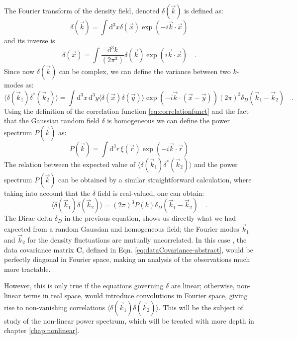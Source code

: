 The Fourier transform of the density field, denoted $\delta(\vec k)$ is defined as:
\begin{equation}
\delta(\vec k) = \int \mathrm{d}^3 x \delta(\vec x) \exp(-i \vec{k} \cdot \vec{x})
\end{equation}
and its inverse is
\begin{equation}
\delta(\vec x) = \int \frac{\mathrm{d}^3 k}{(2\pi^3)} \delta(\vec k) \exp(i \vec{k} \cdot \vec{x}) \quad .
\end{equation}
Since now $\delta(\vec k)$ can be complex, we can define the variance between two $k$-modes as:
\begin{equation}
\langle \delta (\vec{k}_1)  \delta^{*} (\vec{k}_2) \rangle = 
\int \mathrm{d}^3 x \, \mathrm{d}^3 y \langle \delta (\vec{x})  \delta (\vec{y}) \rangle \exp(-i \vec{k} \cdot (\vec{x}-\vec{y}) )
(2\pi)^3 \delta_{D}(\vec{k}_{1}-\vec{k}_{2})  \quad .
\end{equation}
Using the definition of the correlation function \ref{eq:correlationfunct} and the fact that the Gaussian random field $\delta$
is homogeneous we can define the power spectrum $P(\vec k)$ as:
\begin{equation}\label{eq:powerspectrum}
P(\vec k) = \int \mathrm{d}^3r \, \xi(\vec r) \exp(-i \vec{k} \cdot \vec{r})
\end{equation}
The relation between the expected value of $\langle \delta (\vec{k}_1)  \delta^{*} (\vec{k}_2) \rangle$ and the power spectrum $P(\vec k)$ can be obtained by a similar straightforward calculation, \cite{(cite Luca, Dodelson, ??)} where taking into account
that the $\delta$ field is real-valued, one can obtain:
\begin{equation}
\langle \delta (\vec{k}_1)  \delta (\vec{k}_2) \rangle = (2\pi)^3  P(k) \delta_{D}(\vec{k}_{1}-\vec{k}_{2}) \quad .
\end{equation}
The Dirac delta $\delta_D$ in the previous equation, shows us directly what we had expected from a random Gaussian and homogeneous field;
the Fourier modes $\vec{k}_1$ and $\vec{k}_2$ for the density fluctuations are mutually uncorrelated.
In this case , the data covariance matrix $\mathbf{C}$, defined in Eqn. \ref{eq:dataCovariance-abstract},
would be  perfectly diagonal in Fourier space, making an analysis of the observations much more tractable.

However, this is only true if the equations governing $\delta$ are linear; otherwise, non-linear terms in real space,
would introduce convolutions in Fourier space, giving rise to non-vanishing correlations $\langle \delta (\vec{k}_1)  \delta (\vec{k}_2) \rangle$. This will be the subject of study of the non-linear power spectrum, which will be treated with more depth in chapter \ref{chap:nonlinear}.

